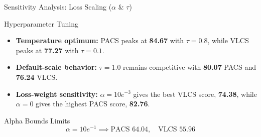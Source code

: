 \documentclass[t, aspectratio=169]{beamer} %
\begin{document}
\begin{frame}{Sensitivity Analysis: Loss Scaling ($\alpha$ \& $\tau$)}
		\begin{block}{Hyperparameter Tuning}
			\begin{itemize}
				\item \textbf{Temperature optimum:} PACS peaks at \textbf{84.67} with $\tau=0.8$, while VLCS peaks at \textbf{77.27} with $\tau=0.1$.
				\item \textbf{Default-scale behavior:} $\tau=1.0$ remains competitive with \textbf{80.07} PACS and \textbf{76.24} VLCS.
				\item \textbf{Loss-weight sensitivity:} $\alpha=10e^{-3}$ gives the best VLCS score, \textbf{74.38}, while $\alpha=0$ gives the highest PACS score, \textbf{82.76}.
			\end{itemize}
		\end{block}
		\begin{alertblock}{Alpha Bounds Limits }
			\[ \alpha = 10e^{-1} \implies \text{PACS } 64.04,\quad \text{VLCS } 55.96 \]
		\end{alertblock}
	\end{frame}
\end{document}
